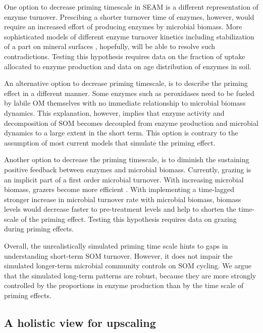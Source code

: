 One option to decrease priming timescale in SEAM is a different representation
of enzyme turnover. Prescibing a shorter turnover time of enzymes, however,
would require an increased effort of producing enzymes by microbial biomass.
More sophisticated models of different enzyme turnover kinetics including
stabilization of a part on mineral surfaces \citep{Burns13}, hopefully, will be
able to resolve such contradictions. Testing this hypothesis requires data on
the fraction of uptake allocated to enzyme production and data on age distribution
of enzymes in soil.

An alternative option to decrease priming timescale, is to describe the priming
effect in a different manner. Some enzymes such as peroxidases need to be
fueled by labile OM themselves \citep{Rousk14} with no
immediate relationship to microbial biomass dynamics. This explanation, however, implies that enzyme
activity and decomposition of SOM becomes decoupled from enzyme production and
microbial dynamics to a large extent in the short term.
This option is contrary to the assumption of most current models that simulate
the priming effect. 

Another option to decrease the priming timescale, is to diminish the sustaining
positive feedback between enzymes and microbial biomass. Currently, grazing is
an implicit part of a first order microbial turnover. With increasing microbial
biomass, grazers become more efficient \citep{Clarholm81}. With implementing a
time-lagged stronger increase in microbial turnover rate with microbial biomass,
biomass levels would decrease faster to pre-treatment levels and help to shorten
the time-scale of the priming effect. Testing this hypothesis requires data on
grazing during priming effects.

Overall, the unrealistically simulated priming time scale hints to gaps in
understanding short-term SOM turnover. However, it does not impair the simulated
longer-term microbial community controls on SOM cycling. We argue that the
simulated long-term patterns are robust, because they are more strongly
controlled by the proportions in enzyme production than by the time scale of
priming effects.

\subsection{A holistic view for upscaling}
\label{sec:Holistic}

